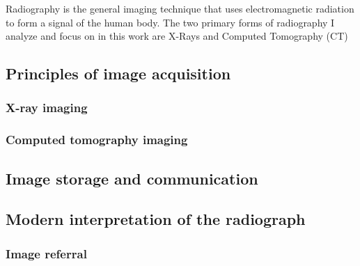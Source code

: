 Radiography is the general imaging technique that uses electromagnetic radiation to form a signal of the human body. The two primary forms of radiography I analyze and focus on in this work are X-Rays and Computed Tomography (CT)

\subsection{Principles of image acquisition}

\subsubsection{X-ray imaging}

\subsubsection{Computed tomography imaging}


\subsection{Image storage and communication}

\subsection{Modern interpretation of the radiograph}


\subsubsection{Image referral}